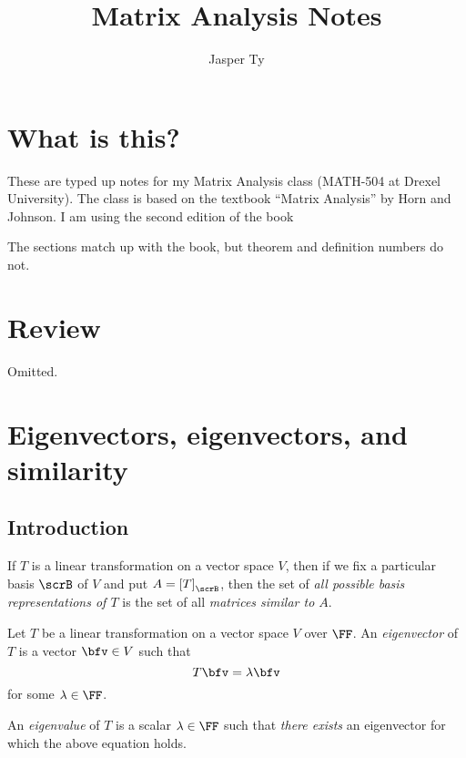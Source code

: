 \documentclass{article}
\title{Matrix Analysis Notes}
\author{Jasper Ty}
\newcommand{\inbasis}[2]{\ensuremath{\left[#1\right]_{#2}}}
\begin{document}
\maketitle

\section*{What is this?}
These are typed up notes for my Matrix Analysis class (MATH-504 at Drexel University).
The class is based on the textbook ``Matrix Analysis'' by Horn and Johnson.
I am using the second edition of the book \cite{HoJo}

The sections match up with the book, but theorem and definition numbers do not.

\tableofcontents

\setcounter{section}{-1}
\section{Review}

Omitted.

\section{Eigenvectors, eigenvectors, and similarity}

\setcounter{subsection}{-1}
\subsection{Introduction}

\begin{proposition}
    If $T$ is a linear transformation on a vector space $V$, then if we fix a particular basis $\scrB$ of $V$ and put $A = \inbasis{T}{\scrB}$, then the set of \textit{all possible basis representations of $T$} is the set of all \textit{matrices similar to $A$}.
\end{proposition}

\begin{definition}
    Let $T$ be a linear transformation on a vector space $V$ over $\FF$.
    An \textit{eigenvector} of $T$ is a vector $\bfv \in V$ such that
    \[
        T\bfv = \lambda\bfv
    \]
    for some $\lambda \in \FF$.

    An \textit{eigenvalue} of $T$ is a scalar $\lambda \in \FF$ such that \textit{there exists} an eigenvector for which the above equation holds.
\end{definition}
\end{document}
